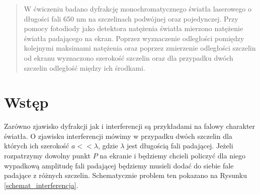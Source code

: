\documentclass{article}
\begin{document}
\begin{abstract}
	W ćwiczeniu badano dyfrakcję monochromatycznego światła laserowego o długości fali 650 nm na szczelinach podwójnej oraz pojedynczej. Przy pomocy fotodiody jako detektora natężenia światła mierzono natężenie światła padającego na ekran. Poprzez wyznaczenie odległości pomiędzy kolejnymi maksimami natężenia oraz poprzez zmierzenie odległości szczelin od ekranu wyznaczono  szerokość szczelin oraz dla przypadku dwóch szczelin odległość między ich środkami. 
\end{abstract}

\section{Wstęp}
Zarówno zjawisko dyfrakcji jak i interferencji są przykładami na falowy charakter światła. O zjawisku interferencji mówimy w przypadku dwóch szczelin dla których ich szerokość $a<<\lambda$, gdzie $\lambda$ jest długością fali padającej. Jeżeli rozpatrzymy dowolny punkt $P$ na ekranie i będziemy chcieli policzyć dla niego wypadkową amplitudę fali padającej będziemy musieli dodać do siebie fale padające z różnych szczelin. Schematycznie problem ten pokazano na Rysunku \ref{schemat_interferencja}.
\end{document}

